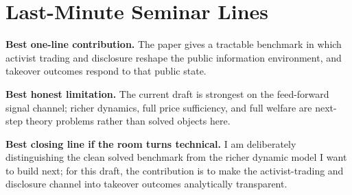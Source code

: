 \documentclass[9pt,a4paper]{extarticle}
\begin{document}
\section{Last-Minute Seminar Lines}

\textbf{Best one-line contribution.}
The paper gives a tractable benchmark in which activist trading and disclosure reshape the public information environment, and takeover outcomes respond to that public state.

\textbf{Best honest limitation.}
The current draft is strongest on the feed-forward signal channel; richer dynamics, full price sufficiency, and full welfare are next-step theory problems rather than solved objects here.

\textbf{Best closing line if the room turns technical.}
I am deliberately distinguishing the clean solved benchmark from the richer dynamic model I want to build next; for this draft, the contribution is to make the activist-trading and disclosure channel into takeover outcomes analytically transparent.
\end{document}
